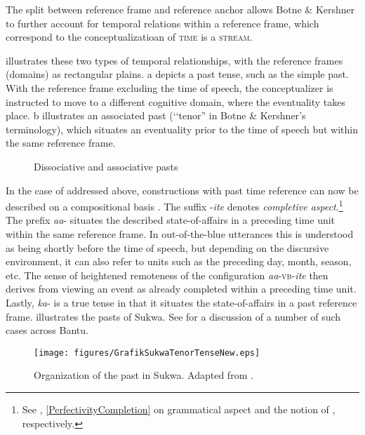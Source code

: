 The split between reference frame and reference anchor allows Botne \& Kershner to further account for temporal relations within a reference frame, which correspond to the conceptualizatioan of \textsc{time} is a \textsc{stream}. 

 illustrates these two types of temporal relationships, with the reference frames (domains) as rectangular plains. a depicts a past tense, such as the  simple past. With the reference frame excluding the time of speech, the conceptualizer is instructed to move to a different cognitive domain, where the eventuality takes place. b illustrates an associated past (\lq\lq tenor'' in Botne \& Kershner's terminology), which situates an eventuality prior to the time of speech but within the same reference frame.

\begin{figure}[th]
\caption{\label{PastDDomain}Dissociative and associative pasts}
\end{figure}

\largerpage
In the case of  addressed above, constructions with past time reference can now be described on a compositional basis \citep{KershnerT2002}. The suffix \mbox{-\textit{ite}} denotes \textit{completive aspect}.\footnote{See , \ref{PerfectivityCompletion} on grammatical aspect and the notion of , respectively.} The prefix \textit{aa}- situates the described state-of-affairs in a preceding time unit within the same reference frame. In out-of-the-blue utterances this is understood as being shortly before the time of speech, but depending on the discursive environment, it can also refer to units such as the preceding day, month, season, etc.
The sense of heightened remoteness of the configuration \mbox{\textit{aa}-}\textsc{vb}\mbox{-\textit{ite}} then derives from viewing an event as already completed within a preceding time unit. Lastly, \textit{ka}- is a true tense in that it situates the state-of-affairs in a past reference frame.  illustrates the pasts of Sukwa. See \citet{BotneRKershnerT2008} for a discussion of a number of such cases across Bantu.

\begin{figure}[tbh]
\caption{\label{FigureSukwaTenorTense}Organization of the past in Sukwa. Adapted from \citet[113]{KershnerT2002}.}
\begin{center}
\texttt{[image: figures/GrafikSukwaTenorTenseNew.eps]}
\end{center}
\end{figure}

